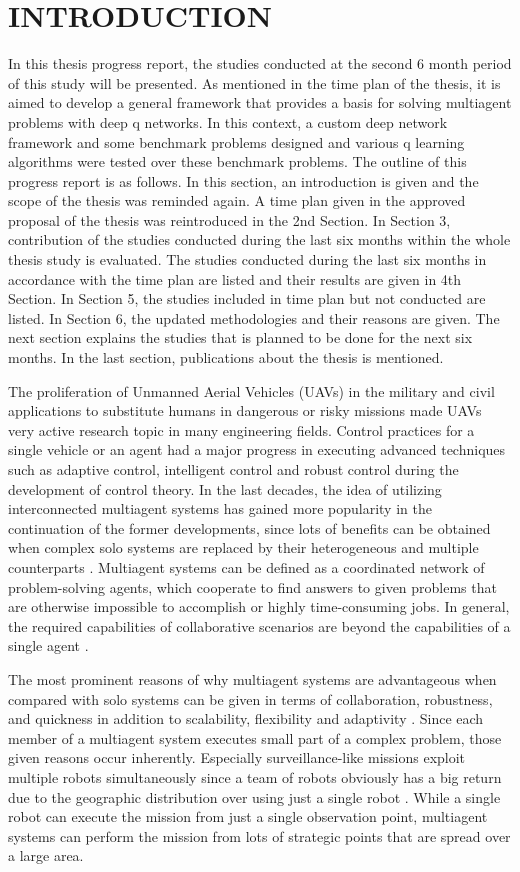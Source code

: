 \documentclass{ituphdreport}
\begin{document}
\section{INTRODUCTION}
In this thesis progress report, the studies conducted at the second 6 month period of this study will be presented. As mentioned in the time plan of the thesis, it is aimed to develop a general framework that provides a basis for solving multiagent problems with deep q networks. In this context, a custom deep network framework and some benchmark problems designed and various q learning algorithms were tested over these benchmark problems. The outline of this progress report is as follows. In this section, an introduction is given and the scope of the thesis was reminded again. A time plan given in the approved proposal of the thesis was reintroduced in the 2nd Section. In Section 3, contribution of the studies conducted during the last six months within the whole thesis study is evaluated. The studies conducted during the last six months in accordance with the time plan are listed and their results are given in 4th Section. In Section 5, the studies included in time plan but not conducted are listed. In Section 6, the updated methodologies and their reasons are given. The next section explains the studies that is planned to be done for the next six months. In the last section, publications about the thesis is mentioned.

The proliferation of Unmanned Aerial Vehicles (UAVs) in the military and civil applications to substitute humans in dangerous or risky missions made UAVs very active research topic in many engineering fields. Control practices for a single vehicle or an agent had a major progress in executing advanced techniques such as adaptive control, intelligent control and robust control during the development of control theory. In the last decades, the idea of utilizing interconnected multiagent systems has gained more popularity in the continuation of the former developments, since lots of benefits can be obtained when complex solo systems are replaced by their heterogeneous and multiple counterparts \cite{rencao11}. Multiagent systems can be defined as a coordinated network of problem-solving agents, which cooperate to find answers to given problems that are otherwise impossible to accomplish or highly time-consuming jobs. In general, the required capabilities of collaborative scenarios are beyond the capabilities of a single agent \cite{glavic06}.

The most prominent reasons of why multiagent systems are advantageous when compared with solo systems can be given in terms of collaboration, robustness, and quickness in addition to scalability, flexibility and adaptivity \cite{clement04}. Since each member of a multiagent system executes small part of a complex problem, those given reasons occur inherently. Especially surveillance-like missions exploit multiple robots simultaneously since a team of robots obviously has a big return due to the geographic distribution over using just a single robot \cite{stone00}. While a single robot can execute the mission from just a single observation point, multiagent systems can perform the mission from lots of strategic points that are spread over a large area.
\end{document}
